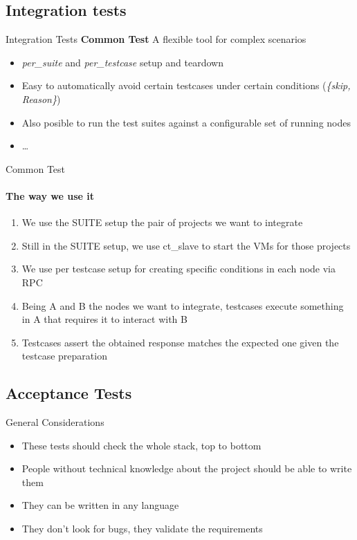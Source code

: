 \documentclass[]{beamer}
\begin{document}
\subsection*{Integration tests}
\label{integration_tests}
\begin{frame}{Integration Tests}
    \textbf{Common Test} A flexible tool for complex scenarios
    \begin{itemize}
    \pause
    \item \emph{per\_suite} and \emph{per\_testcase} setup and teardown
    \pause
    \item Easy to automatically avoid certain testcases under certain conditions (\emph{\{skip, Reason\}})
    \pause
    \item Also posible to run the test suites against a configurable set of running nodes
    \pause
    \item \dots
    \end{itemize}
\end{frame}

\begin{frame}{Common Test}
    \framesubtitle {The way we use it}
    \begin{enumerate}
    \item We use the SUITE setup the pair of projects we want to integrate
    \pause
    \item Still in the SUITE setup, we use ct\_slave to start the VMs for those projects
    \pause
    \item We use per testcase setup for creating specific conditions in each node via RPC
    \pause
    \item Being A and B the nodes we want to integrate, testcases execute something in A that requires it to interact
    with B
    \pause
    \item Testcases assert the obtained response matches the expected one given the testcase preparation
    \end{enumerate}
\end{frame}

\subsection*{Acceptance Tests}
\label{acceptance_tests}

\begin{frame}{General Considerations}
    \begin{itemize}
    \item These tests should check the whole stack, top to bottom
    \pause
    \item People without technical knowledge about the project should be able to write them
    \pause
    \item They can be written in any language
    \pause
    \item They don't look for bugs, they validate the requirements
    \end{itemize}
\end{frame}
\end{document}

